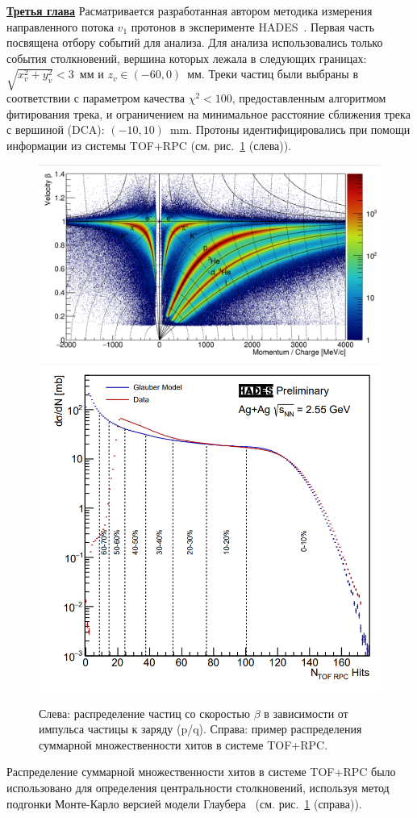 \underline{\textbf{Третья глава}} Расматривается разработанная автором методика измерения направленного потока $v_1$ протонов в эксперименте HADES~\cite{Mamaev:2020lpi,HADES:2020lob,Mamaev:2020qom}. 
Первая часть посвящена отбору событий для анализа. 
Для анализа использовались только события столкновений, вершина которых лежала в следующих границах: $\sqrt{x_v^2+y_v^2}<3$~мм и $z_v \in (-60, 0)$~мм.
Треки частиц были выбраны в соответствии с параметром качества $\chi^2<100$, предоставленным алгоритмом фитирования трека, и ограничением на минимальное расстояние сближения трека с вершиной (DCA): $(-10,10)$~mm. 
Протоны идентифицировались при помощи информации из системы  TOF+RPC (см. рис.~\ref{fig:hades_pid} (слева)).

\begin{figure}[h]
\begin{center}
  \includegraphics[width=0.54\linewidth]{images/hades_pid_plot.png}
  \includegraphics[width=0.33\linewidth]{images/hades_mult.png}
  \caption{ Слева: распределение частиц со скоростью $\beta$  в зависимости от  импульса частицы к заряду
    (p/q). Справа: пример распределения суммарной множественности хитов в системе TOF+RPC.}
\label{fig:hades_pid}
\end{center}
\end{figure}

Распределение суммарной множественности хитов в системе TOF+RPC было использовано для определения центральности столкновений, используя метод подгонки Монте-Карло версией модели Глаубера ~\cite{HADES:2017def}(см. рис.~\ref{fig:hades_pid} (справа)).

